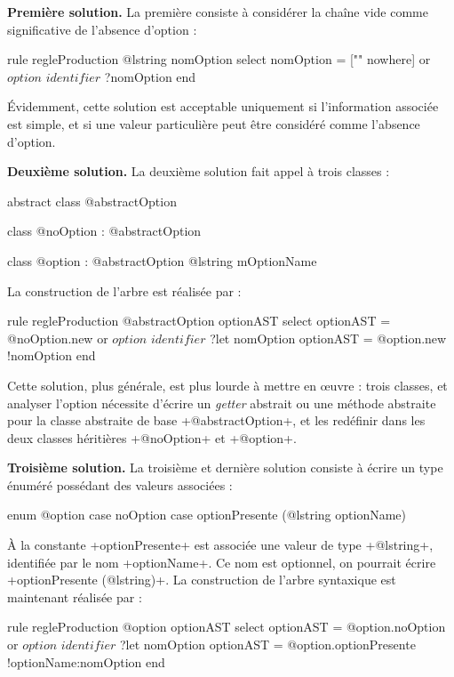 \textbf{Première solution.} La première consiste à considérer la chaîne vide comme significative de l'absence d'option :
\begin{galgas}
rule regleProduction {
  @lstring nomOption
  select
    nomOption = ["" nowhere]
  or
    $option$
    $identifier$ ?nomOption
  end
}
\end{galgas}

Évidemment, cette solution est acceptable uniquement si l'information associée est simple, et si une valeur particulière peut être considéré comme l'absence d'option.

\textbf{Deuxième solution.} La deuxième solution fait appel à trois classes :
\begin{galgas}
abstract class @abstractOption {}

class @noOption : @abstractOption {}

class @option : @abstractOption { @lstring mOptionName }
\end{galgas}

La construction de l'arbre est réalisée par :
\begin{galgas}
rule regleProduction {
  @abstractOption optionAST
  select
    optionAST = @noOption.new
  or
    $option$
    $identifier$ ?let nomOption
    optionAST = @option.new {!nomOption}
  end
}
\end{galgas}

Cette solution, plus générale, est plus lourde à mettre en œuvre : trois classes, et analyser l'option nécessite d'écrire un \emph{getter} abstrait ou une méthode abstraite pour la classe abstraite de base \ggs+@abstractOption+, et les redéfinir dans les deux classes héritières \ggs+@noOption+ et \ggs+@option+.

\textbf{Troisième solution.} La troisième et dernière solution consiste à écrire un type énuméré possédant des valeurs associées :

\begin{galgas}
enum @option {
  case noOption
  case optionPresente (@lstring optionName)
}
\end{galgas}

À la constante \ggs+optionPresente+ est associée une valeur de type \ggs+@lstring+, identifiée par le nom \ggs+optionName+. Ce nom est optionnel, on pourrait écrire \ggs+optionPresente (@lstring)+. La construction de l'arbre syntaxique est maintenant réalisée par :
\begin{galgas}
rule regleProduction {
  @option optionAST
  select
    optionAST = @option.noOption
  or
    $option$
    $identifier$ ?let nomOption
    optionAST = @option.optionPresente {!optionName:nomOption}
  end
}
\end{galgas}

